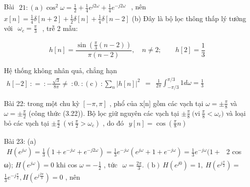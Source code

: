 \documentclass[
  10
]{article}
\begin{document}
Bài
\(\begin{array} { r } { 2 1 \colon ( \mathrm { a } ) \cos ^ { 2 } \omega = \frac { 1 } { 2 } + \frac { 1 } { 4 } e ^ { j 2 \omega } + \frac { 1 } { 4 } e ^ { - j 2 \omega } } \end{array}\)
, nên
\(x [ n ] = { \textstyle { \frac { 1 } { 4 } } } \delta [ n + 2 ] + { \textstyle { \frac { 1 } { 2 } } } \delta [ n ] + { \textstyle { \frac { 1 } { 4 } } } \delta [ n - 2 ]\)
(b) Đây là bộ lọc thông thấp lý tưởng với
\(\begin{array} { r } { \omega _ { c } = \frac { \pi } { 3 } } \end{array}\)
, trễ 2 mẫu:

\[
h [ n ] = \frac {\sin (\frac {\pi}{3} (n - 2))}{\pi (n - 2)}, \quad n \neq 2; \qquad h [ 2 ] = \frac {1}{3}
\]

Hệ thống không nhân quả, chẳng hạn
\(\begin{array} { r } { h [ - 2 ] \ : = \ : - \frac { \sqrt { 3 } } { 8 \pi } \neq \ : 0 . \ : ( \mathrm { c } ) \ : \sum _ { n } \vert h [ n ] \vert ^ { 2 } } \end{array}\)
=
\(\begin{array} { r } { \frac { 1 } { 2 \pi } \int _ { - \pi / 3 } ^ { \pi / 3 } 1 d \omega = \frac { 1 } { 3 } } \end{array}\)

Bài 22: trong một chu kỳ \([ - \pi , \pi ]\) , phổ của x{[}n{]} gồm các
vạch tại \(\omega = \pm \frac { \pi } { 8 }\) và
\(\omega = \pm \frac { \pi } { 2 }\) (công thức (3.22)). Bộ lọc giữ
nguyên các vạch tại
\(\pm \frac { \pi } { 8 } \ \mathrm { ( v i } \ \frac { \pi } { 8 } < \omega _ { c } )\)
và loại bỏ các vạch tại
\(\pm \frac { \pi } { 2 } \ \left( \mathrm { v { i } } \ \frac { \pi } { 2 } > \omega _ { c } \right)\)
, do đó
\(\begin{array} { r } { y [ n ] = \cos ( \frac { \pi } { 8 } n ) } \end{array}\)

Bài 23: (a)
\(\begin{array} { r } { H ( e ^ { j \omega } ) = \frac 1 3 ( 1 + e ^ { - j \omega } + e ^ { - j 2 \omega } ) = \frac 1 3 e ^ { - j \omega } ( e ^ { j \omega } + 1 + e ^ { - j \omega } ) = \frac 1 3 e ^ { - j \omega } ( 1 + } \end{array}\)
2 cos ω); \(H ( e ^ { j \omega } ) = 0\) khi cos
\(\omega = - \frac { 1 } { 2 }\) , tức
\(\begin{array} { r } { \omega = \frac { 2 \pi } { 3 } . \ ( \mathrm { b } ) \ H ( e ^ { j 0 } ) = 1 , \ H ( e ^ { j \frac { \pi } { 2 } } ) = } \end{array}\)
\({ \textstyle \frac { 1 } { 3 } } e ^ { - j { \frac { \pi } { 2 } } } , H ( e ^ { j { \frac { 2 \pi } { 3 } } } ) = 0\)
, nên
\end{document}
